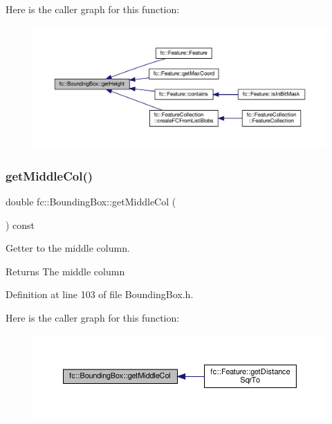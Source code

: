 Here is the caller graph for this function\+:
\nopagebreak
\begin{figure}[H]
\begin{center}
\leavevmode
\includegraphics[width=350pt]{db/dc1/classfc_1_1BoundingBox_a9f26359f081940896dcf90ab5d5f0132_icgraph}
\end{center}
\end{figure}
\mbox{\label{classfc_1_1BoundingBox_a5d829bb45a327c47b4a6d4f563cbef0c}} 
\subsubsection{\texorpdfstring{get\+Middle\+Col()}{getMiddleCol()}}
{\footnotesize\ttfamily double fc\+::\+Bounding\+Box\+::get\+Middle\+Col (\begin{DoxyParamCaption}{ }\end{DoxyParamCaption}) const\hspace{0.3cm}{\ttfamily [inline]}}



Getter to the middle column. 

\begin{DoxyReturn}{Returns}
The middle column 
\end{DoxyReturn}


Definition at line 103 of file Bounding\+Box.\+h.

Here is the caller graph for this function\+:
\nopagebreak
\begin{figure}[H]
\begin{center}
\leavevmode
\includegraphics[width=350pt]{db/dc1/classfc_1_1BoundingBox_a5d829bb45a327c47b4a6d4f563cbef0c_icgraph}
\end{center}
\end{figure}
\mbox{\label{classfc_1_1BoundingBox_a96d9180aacc790de07f07dde841e9d01}} 
